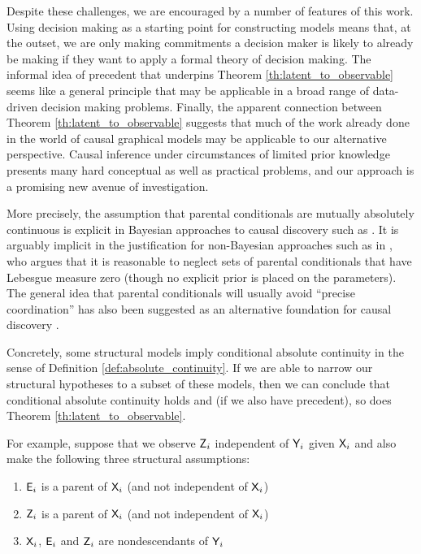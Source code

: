 Despite these challenges, we are encouraged by a number of features of this work. Using decision making as a starting point for constructing models means that, at the outset, we are only making commitments a decision maker is likely to already be making if they want to apply a formal theory of decision making. The informal idea of precedent that underpins Theorem \ref{th:latent_to_observable} seems like a general principle that may be applicable in a broad range of data-driven decision making problems. Finally, the apparent connection between Theorem \ref{th:latent_to_observable} suggests that much of the work already done in the world of causal graphical models may be applicable to our alternative perspective. Causal inference under circumstances of limited prior knowledge presents many hard conceptual as well as practical problems, and our approach is a promising new avenue of investigation.

More precisely, the assumption that parental conditionals are mutually absolutely continuous is explicit in Bayesian approaches to causal discovery such as \citet{heckerman_learning_1995}. It is arguably implicit in the justification for non-Bayesian approaches such as in \citet{meek_strong_1995}, who argues that it is reasonable to neglect sets of parental conditionals that have Lebesgue measure zero (though no explicit prior is placed on the parameters). The general idea that parental conditionals will usually avoid ``precise coordination'' has also been suggested as an alternative foundation for causal discovery \citet{lemeire_replacing_2013,mooij_j.m._distinguishing_2016,janzingInformationgeometricApproachInferring2012}. 


Concretely, some structural models imply conditional absolute continuity in the sense of Definition \ref{def:absolute_continuity}. If we are able to narrow our structural hypotheses to a subset of these models, then we can conclude that conditional absolute continuity holds and (if we also have precedent), so does Theorem \ref{th:latent_to_observable}.

For example, suppose that we observe $\mathsf{Z}_i$ independent of $\mathsf{Y}_i$ given $\mathsf{X}_i$ and also make the following three structural assumptions:
\begin{enumerate}
    \item $\mathsf{E}_i$ is a parent of $\mathsf{X}_i$ (and not independent of $\mathsf{X}_i$)
    \item $\mathsf{Z}_i$ is a parent of $\mathsf{X}_i$ (and not independent of $\mathsf{X}_i$)
    \item $\mathsf{X}_i$, $\mathsf{E}_i$ and $\mathsf{Z}_i$ are nondescendants of $\mathsf{Y}_i$
\end{enumerate}

